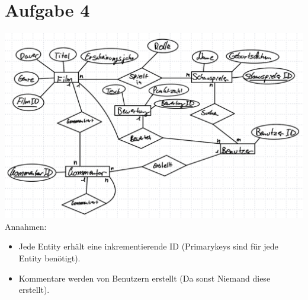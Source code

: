 \section*{Aufgabe 4}
\includegraphics[width=\linewidth]{./img/aufgabe4.png}
Annahmen:
\begin{itemize}
\item Jede Entity erhält eine inkrementierende ID (Primarykeys sind für jede Entity benötigt).
\item Kommentare werden von Benutzern erstellt (Da sonst Niemand diese erstellt).
\end{itemize}